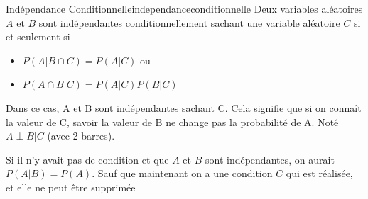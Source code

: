 \begin{definition}{Indépendance Conditionnelle}{independanceconditionnelle}
    Deux variables aléatoires $A$ et $B$ sont indépendantes conditionnellement sachant une variable aléatoire $C$ si et seulement si 
    \begin{itemize}
        \item $P(A | B \cap C) = P(A | C)$ ou 
        \item $P(A \cap B | C) = P(A | C)P(B | C)$
    \end{itemize}
    Dans ce cas, A et B sont indépendantes sachant C. 
    Cela signifie que si on connaît la valeur de C, savoir la valeur de B ne change pas la probabilité de A.
    Noté $A \perp B | C$ (avec 2 barres).
\end{definition}
\begin{remark}\leavevmode
    Si il n'y avait pas de condition et que $A$ et $B$ sont indépendantes, 
    on aurait $P(A | B) = P(A)$. Sauf que maintenant on a une condition $C$ qui est réalisée, et elle ne peut être supprimée
\end{remark}

